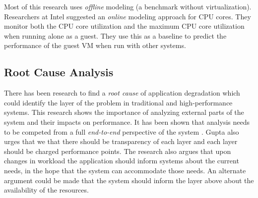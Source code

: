 Most of this research uses \emph{offline} modeling (a benchmark without virtualization).  Researchers at Intel \cite{tickoo} suggested an \emph{online} modeling approach for CPU cores.  They monitor both the CPU core utilization and the maximum CPU core utilization when running alone as a guest.  They use this as a baseline to predict the performance of the guest VM when run with other systems.

\subsection{Root Cause Analysis}
There has been research to find a \emph{root cause} of application degradation which could identify the layer of the problem in traditional \cite{traeger} and high-performance \cite{knapp1} systems.  This research shows the importance of analyzing external parts of the system and their impacts on performance.  It has been shown that analysis needs to be competed from a full \emph{end-to-end} perspective of the system \cite{saltzer}.  Gupta \cite{gupta1} also urges that we that there should be transparency of each layer and each layer should be charged performance points.  The research also argues that upon changes in workload the application should inform systems about the current needs, in the hope that the system can accommodate those needs.  An alternate argument could be made that the system should inform the layer above about the availability of the resources.  


